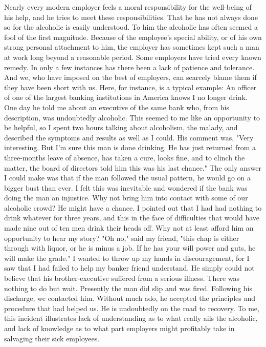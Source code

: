 \begin{biblechapter}
Nearly every modern employer feels a moral responsibility for the well-being of his help, and he tries to meet these responsibilities.  That he has not always done so for the alcoholic is easily understood.  To him the alcoholic has often seemed a fool of the first magnitude.  Because of the employee's special ability, or of his own strong personal attachment to him, the employer has sometimes kept such a man at work long beyond a reasonable period.  Some employers have tried every known remedy.  In only a few instances has there been a lack of patience and tolerance.  And we, who have imposed on the best of employers, can scarcely blame them if they have been short with us.
Here, for instance, is a typical example:  An officer of one of the largest banking institutions in America knows I no longer drink.  One day he told me about an executive of the same bank who, from his description, was undoubtedly alcoholic.  This seemed to me like an opportunity to be helpful, so I spent two hours talking about alcoholism, the malady, and described the symptoms and results as well as I could.  His comment was, "Very interesting.  But I'm sure this man is done drinking.  He has just returned from a three-months leave of absence, has taken a cure, looks fine, and to clinch the matter, the board of directors told him this was his last chance."
The only answer I could make was that if the man followed the usual pattern, he would go on a bigger bust than ever.  I felt this was inevitable and wondered if the bank was doing the man an injustice.  Why not bring him into contact with some of our alcoholic crowd?  He might have a chance.  I pointed out that I had had nothing to drink whatever for three years, and this in the face of difficulties that would have made nine out of ten men drink their heads off.  Why not at least afford him an opportunity to hear my story?  "Oh no," said my friend, "this chap is either through with liquor, or he is minus a job.  If he has your will power and guts, he will make the grade."
I wanted to throw up my hands in discouragement, for I saw that I had failed to help my banker friend understand.  He simply could not believe that his brother-executive suffered from a serious illness.  There was nothing to do but wait.
Presently the man did slip and was fired.  Following his discharge, we contacted him.  Without much ado, he accepted the principles and procedure that had helped us.  He is undoubtedly on the road to recovery.  To me, this incident illustrates lack of understanding as to what really ails the alcoholic, and lack of knowledge as to what part employers might profitably take in salvaging their sick employees.

\end{biblechapter}
